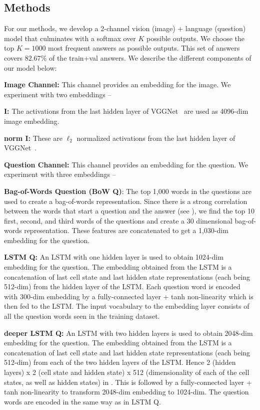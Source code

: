 \subsection{Methods}
\label{sec:methods}
For our methods, we develop a 2-channel vision (image) + language (question) model that culminates with a softmax over $K$ possible outputs. We choose the top $K = 1000$ most frequent answers as possible outputs. This set of answers covers $82.67\%$ of the train+val answers. We describe the different components of our model below:

\textbf{Image Channel:} This channel provides an embedding for the image. We experiment with two embeddings -- 
\begin{compactenum}
\item \textbf{I:} The activations from the last hidden layer of VGGNet~\cite{Simonyan14c} are used as 4096-dim image embedding.
\item \textbf{norm I:} These are $\ell_2$ normalized activations from the last hidden layer of VGGNet~\cite{Simonyan14c}.
\end{compactenum}

\textbf{Question Channel:} This channel provides an embedding for the question. We experiment with three embeddings --
\begin{compactenum}
\item \textbf{Bag-of-Words Question (BoW Q)}: The top 1,000 words in the questions are used to create a bag-of-words representation. Since there is a strong correlation between the words that start a question and the answer (see ), we find the top 10 first, second, and third words of the questions and create a 30 dimensional bag-of-words representation. These features are concatenated to get a 1,030-dim embedding for the question.
\item \textbf{LSTM Q:} An LSTM with one hidden layer is used to obtain 1024-dim embedding for the question. The embedding obtained from the LSTM is a concatenation of last cell state and last hidden state representations (each being 512-dim) from the hidden layer of the LSTM. Each question word is encoded with 300-dim embedding by a fully-connected layer + tanh non-linearity which is then fed to the LSTM. The input vocabulary to the embedding layer consists of all the question words seen in the training dataset.
\item \textbf{deeper LSTM Q:} An LSTM with two hidden layers is used to obtain 2048-dim embedding for the question. The embedding obtained from the LSTM is a concatenation of last cell state and last hidden state representations (each being 512-dim) from each of the two hidden layers of the LSTM. Hence 2 (hidden layers) x 2 (cell state and hidden state) x 512 (dimensionality of each of the cell states, as well as hidden states) in . This is followed by a fully-connected layer + tanh non-linearity to transform 2048-dim embedding to 1024-dim. The question words are encoded in the same way as in LSTM Q.   
\end{compactenum}

